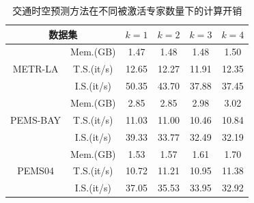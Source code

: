 \begin{table}[t!]
    \centering
    \caption{交通时空预测方法在不同被激活专家数量下的计算开销}
    \label{tab:efficiency}
    \begin{tabular}{cc|cccc}
    \toprule
        \multicolumn{2}{c|}{\textbf{数据集}} & \textbf{$k=1$} & \textbf{$k=2$} & \textbf{$k=3$} & \textbf{$k=4$} \\
    \midrule
        \multirow{3}{*}{{METR-LA}} 
        & Mem.(GB) & 1.47 & 1.48 & 1.48 & 1.50 \\
        & T.S.(it/s)   & 12.65 & 12.27 & 11.91 & 12.35 \\
        & I.S.(it/s)   & 50.35 & 43.70 & 37.88 & 37.45 \\
    \midrule
        \multirow{3}{*}{{PEMS-BAY}} 
        & Mem.(GB) & 2.85 & 2.85 & 2.98 & 3.02 \\
        & T.S.(it/s)   & 11.03 & 11.00 & 10.46 & 10.84 \\
        & I.S.(it/s)   & 39.33 & 33.77 & 32.49 & 32.19 \\
    \midrule
        \multirow{3}{*}{{PEMS04}} 
        & Mem.(GB) & 1.53 & 1.57 & 1.61 & 1.70 \\
        & T.S.(it/s)   & 10.72 & 11.21 & 10.95 & 11.38 \\
        & I.S.(it/s)   & 37.05 & 35.53 & 33.95 & 32.92 \\
    \bottomrule
    \end{tabular}
\end{table}

